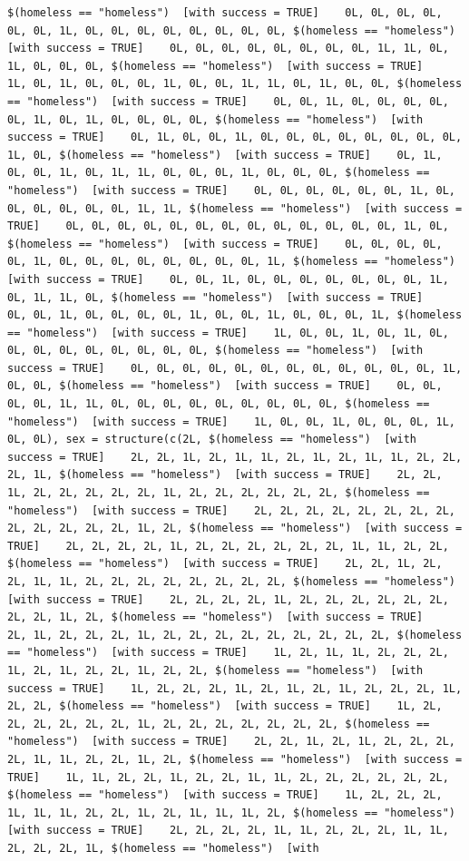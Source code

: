 \documentclass{tufte-book}\usepackage[]{graphicx}\usepackage[]{xcolor}
\makeatletter
\newenvironment{kframe}{%
 \def\at@end@of@kframe{}%
 \ifinner\ifhmode%
  \def\at@end@of@kframe{\end{minipage}}%
  \begin{minipage}{\columnwidth}%
 \fi\fi%
 \def\FrameCommand##1{\hskip\@totalleftmargin \hskip-\fboxsep
 \colorbox{shadecolor}{##1}\hskip-\fboxsep
     \hskip-\linewidth \hskip-\@totalleftmargin \hskip\columnwidth}%
 \MakeFramed {\advance\hsize-\width
   \@totalleftmargin\z@ \linewidth\hsize
   \@setminipage}}%
 {\par\unskip\endMakeFramed%
 \at@end@of@kframe}
\newenvironment{knitrout}{}{} %
\makeatother
\begin{document}
\begin{knitrout}
\begin{kframe}
\begin{verbatim}
$(homeless == "homeless")  [with success = TRUE]    0L, 0L, 0L, 0L, 0L, 0L, 1L, 0L, 0L, 0L, 0L, 0L, 0L, 0L, 0L, $(homeless == "homeless")  [with success = TRUE]    0L, 0L, 0L, 0L, 0L, 0L, 0L, 0L, 1L, 1L, 0L, 1L, 0L, 0L, 0L, $(homeless == "homeless")  [with success = TRUE]    1L, 0L, 1L, 0L, 0L, 0L, 1L, 0L, 0L, 1L, 1L, 0L, 1L, 0L, 0L, $(homeless == "homeless")  [with success = TRUE]    0L, 0L, 1L, 0L, 0L, 0L, 0L, 0L, 1L, 0L, 1L, 0L, 0L, 0L, 0L, $(homeless == "homeless")  [with success = TRUE]    0L, 1L, 0L, 0L, 1L, 0L, 0L, 0L, 0L, 0L, 0L, 0L, 0L, 1L, 0L, $(homeless == "homeless")  [with success = TRUE]    0L, 1L, 0L, 0L, 1L, 0L, 1L, 1L, 0L, 0L, 0L, 1L, 0L, 0L, 0L, $(homeless == "homeless")  [with success = TRUE]    0L, 0L, 0L, 0L, 0L, 0L, 1L, 0L, 0L, 0L, 0L, 0L, 0L, 1L, 1L, $(homeless == "homeless")  [with success = TRUE]    0L, 0L, 0L, 0L, 0L, 0L, 0L, 0L, 0L, 0L, 0L, 0L, 0L, 1L, 0L, $(homeless == "homeless")  [with success = TRUE]    0L, 0L, 0L, 0L, 0L, 1L, 0L, 0L, 0L, 0L, 0L, 0L, 0L, 0L, 1L, $(homeless == "homeless")  [with success = TRUE]    0L, 0L, 1L, 0L, 0L, 0L, 0L, 0L, 0L, 0L, 1L, 0L, 1L, 1L, 0L, $(homeless == "homeless")  [with success = TRUE]    0L, 0L, 1L, 0L, 0L, 0L, 0L, 1L, 0L, 0L, 1L, 0L, 0L, 0L, 1L, $(homeless == "homeless")  [with success = TRUE]    1L, 0L, 0L, 1L, 0L, 1L, 0L, 0L, 0L, 0L, 0L, 0L, 0L, 0L, 0L, $(homeless == "homeless")  [with success = TRUE]    0L, 0L, 0L, 0L, 0L, 0L, 0L, 0L, 0L, 0L, 0L, 0L, 1L, 0L, 0L, $(homeless == "homeless")  [with success = TRUE]    0L, 0L, 0L, 0L, 1L, 1L, 0L, 0L, 0L, 0L, 0L, 0L, 0L, 0L, 0L, $(homeless == "homeless")  [with success = TRUE]    1L, 0L, 0L, 1L, 0L, 0L, 0L, 1L, 0L, 0L), sex = structure(c(2L, $(homeless == "homeless")  [with success = TRUE]    2L, 2L, 1L, 2L, 1L, 1L, 2L, 1L, 2L, 1L, 1L, 2L, 2L, 2L, 1L, $(homeless == "homeless")  [with success = TRUE]    2L, 2L, 1L, 2L, 2L, 2L, 2L, 2L, 1L, 2L, 2L, 2L, 2L, 2L, 2L, $(homeless == "homeless")  [with success = TRUE]    2L, 2L, 2L, 2L, 2L, 2L, 2L, 2L, 2L, 2L, 2L, 2L, 2L, 1L, 2L, $(homeless == "homeless")  [with success = TRUE]    2L, 2L, 2L, 2L, 1L, 2L, 2L, 2L, 2L, 2L, 2L, 1L, 1L, 2L, 2L, $(homeless == "homeless")  [with success = TRUE]    2L, 2L, 1L, 2L, 2L, 1L, 1L, 2L, 2L, 2L, 2L, 2L, 2L, 2L, 2L, $(homeless == "homeless")  [with success = TRUE]    2L, 2L, 2L, 2L, 1L, 2L, 2L, 2L, 2L, 2L, 2L, 2L, 2L, 1L, 2L, $(homeless == "homeless")  [with success = TRUE]    2L, 1L, 2L, 2L, 2L, 1L, 2L, 2L, 2L, 2L, 2L, 2L, 2L, 2L, 2L, $(homeless == "homeless")  [with success = TRUE]    1L, 2L, 1L, 1L, 2L, 2L, 2L, 1L, 2L, 1L, 2L, 2L, 1L, 2L, 2L, $(homeless == "homeless")  [with success = TRUE]    1L, 2L, 2L, 2L, 1L, 2L, 1L, 2L, 1L, 2L, 2L, 2L, 1L, 2L, 2L, $(homeless == "homeless")  [with success = TRUE]    1L, 2L, 2L, 2L, 2L, 2L, 2L, 1L, 2L, 2L, 2L, 2L, 2L, 2L, 2L, $(homeless == "homeless")  [with success = TRUE]    2L, 2L, 1L, 2L, 1L, 2L, 2L, 2L, 2L, 1L, 1L, 2L, 2L, 1L, 2L, $(homeless == "homeless")  [with success = TRUE]    1L, 1L, 2L, 2L, 1L, 2L, 2L, 1L, 1L, 2L, 2L, 2L, 2L, 2L, 2L, $(homeless == "homeless")  [with success = TRUE]    1L, 2L, 2L, 2L, 1L, 1L, 1L, 2L, 2L, 1L, 2L, 1L, 1L, 1L, 2L, $(homeless == "homeless")  [with success = TRUE]    2L, 2L, 2L, 2L, 1L, 1L, 2L, 2L, 2L, 1L, 1L, 2L, 2L, 2L, 1L, $(homeless == "homeless")  [with 
\end{verbatim}
\end{kframe}
\end{knitrout}
\end{document}
